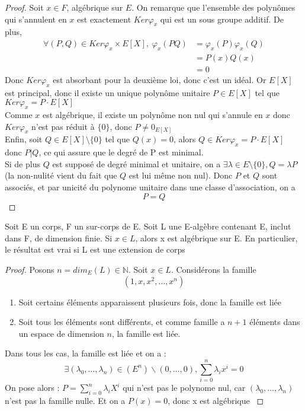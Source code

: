 \documentclass[a4paper,12pt,french,draft]{report}
\begin{document}
				\begin{proof}
					Soit \(x \in F\), algébrique sur \(E\). On remarque que l'ensemble des polynômes qui s'annulent en \(x\) est exactement \(Ker \varphi_{x}\) qui est un sous groupe additif. De plus, 
					\[
						\begin{aligned}
							\forall (P,Q) \in Ker\varphi_{x} \times E[X], \; \varphi_{x}(PQ) &= \varphi_{x}(P)\varphi_{x}(Q) \\
											&=P(x)Q(x) \\
											&= 0
						\end{aligned}
					\]
					Donc \(Ker \varphi_{x}\) est absorbant pour la deuxième loi, donc c'est un idéal. Or \(E[X]\) est principal, donc il existe un unique polynôme unitaire \(P \in E[X]\) tel que \(Ker \varphi_{x} = P \cdot E[X]\)\\
					Comme \(x\) est algébrique, il existe un polynôme non nul qui s'annule en \(x\) donc \(Ker \varphi_{x}\) n'est pas réduit à \(\{0\}\), donc \(P \neq 0_{E[X]}\) \\
					Enfin, soit \(Q \in E[X]\setminus\{0\}\) tel que \( Q(x) = 0 \), alors \(Q \in Ker \varphi_{x} = P \cdot E[X] \) donc \(P | Q\), ce qui assure que le degré de P est minimal.\\
					Si de plus \(Q\) est supposé de degré minimal et unitaire, on a \(\exists \lambda \in E\setminus\{0\} , Q = \lambda P \) (la non-nulité vient du fait que \(Q\) est lui même non nul). Donc \(P\) et \(Q\) sont associés, et par unicité du polynome unitaire dans une classe d'association, on a \[P = Q\] 
				\end{proof}
			
			\begin{proposition}
				Soit E un corps, F un sur-corps de E. Soit L une E-algèbre contenant E, inclut dans F, de dimension finie. Si \(x \in L\), alors x est algébrique sur E. En particulier, le résultat est vrai si L est une extension de corps
			\end{proposition}
				\begin{proof}
					Posons \(n = dim_{E}(L) \in \mathbb{N} \). Soit \(x \in L \). Considérons la famille
					\[{}
						\left( 1 , x , x^{2} , \dots , x^{n} \right)
						\]
					\begin{enumerate}
						\item Soit certains éléments apparaissent plusieurs fois, donc la famille est liée
						\item Soit tous les éléments sont différents, et comme famille a \(n+1\) éléments dans un espace de dimension \(n\), la famille est liée.
					\end{enumerate}
					Dans tous les cas, la famille est liée et on a : 
						\[{}
							\exists (\lambda_{0},\dots,\lambda_{n}) \in (E^{n})\backslash {(0,\dots,0)}, \sum_{i = 0}^{n} \lambda_{i}x^{i} = 0
						\]
						On pose alors : \(P = \sum_{i = 0}^{n} \lambda_{i}X^{i} \) qui n'est pas le polynome nul, car \( (\lambda_{0},\dots,\lambda_{n}) \) n'est pas la famille nulle. Et on a \(P(x) = 0 \), donc x est algébrique  \( \)
				\end{proof}
			
\end{document}
